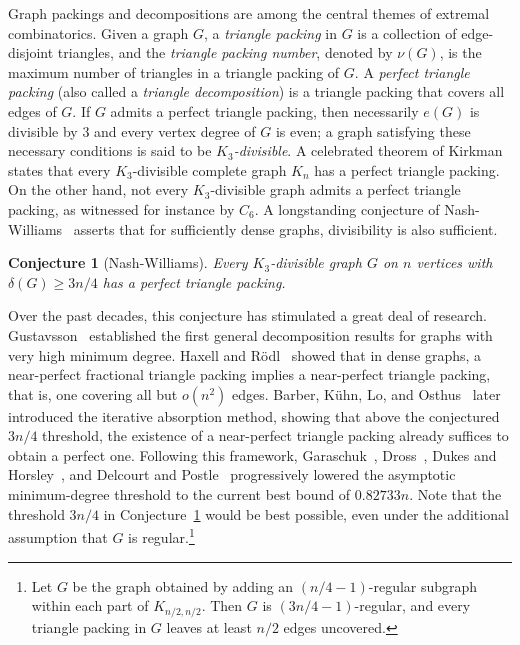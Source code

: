 \documentclass[11pt,reqno]{amsart}
\newtheorem{conjecture}[theorem]{Conjecture}
\theoremstyle{definition}
\theoremstyle{remark}
\renewcommand\geq{\geqslant}
\begin{document}
Graph packings and decompositions are among the central themes of extremal combinatorics. Given a graph $G$, a \emph{triangle packing} in $G$ is a collection of edge-disjoint triangles, and the \emph{triangle packing number}, denoted by $\nu(G)$, is the maximum number of triangles in a triangle packing of $G$. A \emph{perfect triangle packing} (also called a \emph{triangle decomposition}) is a triangle packing that covers all edges of $G$. If $G$ admits a perfect triangle packing, then necessarily $e(G)$ is divisible by $3$ and every vertex degree of $G$ is even; a graph satisfying these necessary conditions is said to be \emph{$K_3$-divisible}. A celebrated theorem of Kirkman~\cite{Kirkman} states that every $K_3$-divisible complete graph $K_n$ has a perfect triangle packing. On the other hand, not every $K_3$-divisible graph admits a perfect triangle packing, as witnessed for instance by $C_6$. A longstanding conjecture of Nash-Williams~\cite{NW} asserts that for sufficiently dense graphs, divisibility is also sufficient.

\begin{conjecture}[Nash-Williams]\label{conj:NW}
Every $K_3$-divisible graph $G$ on $n$ vertices with $\delta(G) \geq 3n/4$ has a perfect triangle packing.
\end{conjecture}

Over the past decades, this conjecture has stimulated a great deal of research. Gustavsson~\cite{Gustavsson} established the first general decomposition results for graphs with very high minimum degree. Haxell and R\"{o}dl~\cite{HR} showed that in dense graphs, a near-perfect fractional triangle packing implies a near-perfect triangle packing, that is, one covering all but $o(n^2)$ edges. Barber, Kühn, Lo, and Osthus~\cite{BKLO} later introduced the iterative absorption method, showing that above the conjectured $3n/4$ threshold, the existence of a near-perfect triangle packing already suffices to obtain a perfect one. Following this framework, Garaschuk~\cite{Garaschuk}, Dross~\cite{Dross}, Dukes and Horsley~\cite{DH}, and Delcourt and Postle~\cite{DelcourtPostle} progressively lowered the asymptotic minimum-degree threshold to the current best bound of $0.82733n$. Note that the threshold $3n/4$ in Conjecture~\ref{conj:NW} would be best possible, even under the additional assumption that $G$ is regular.\footnote{Let $ G $ be the graph obtained by adding an $ (n/4 - 1) $-regular subgraph within each part of $ K_{n/2,n/2} $. Then $ G $ is $(3n/4 - 1)$-regular, and every triangle packing in $ G $ leaves at least $ n/2 $ edges uncovered.}
\end{document}
